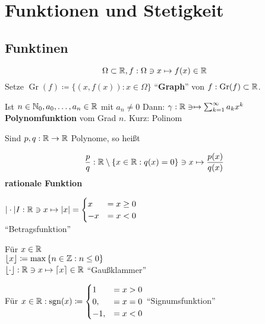 \section{Funktionen und Stetigkeit}
\subsection{Funktinen}

\[
	\Omega \subset \mathbb{R} , f: \Omega \ni x \mapsto f(x) \in \mathbb{R} 
\]
Setze $ \operatorname{Gr}(f) \coloneqq \{ (x, f(x)): x \in \Omega \} $ ``\textbf{Graph}'' von $ f: \operatorname{Gr}(f) \subset \mathbb{R}  $.
\begin{subexample}
	Ist $ n \in \mathbb{N}_0, a_0, \dotsc, a_n \in \mathbb{R}  $ mit $ a_n \neq  0 $ Dann: $ \gamma: \mathbb{R} \ni \mapsto \sum_{k=1}^{\infty} a_k x^k $\textbf{Polynomfunktion} vom Grad $ n $. Kurz: Polinom
\end{subexample}

\begin{subexample}
	Sind $ p, q: \mathbb{R} \to \mathbb{R}  $ Polynome, so heißt
	
	\[
		\frac{ p }{ q } : \mathbb{R} \setminus \{x \in \mathbb{R} :q(x) = 0\} \ni x \mapsto \frac{ p(x) }{ q(x) }
	\]
	\textbf{rationale Funktion}
\end{subexample}

\begin{subexample}
	$ |\cdot| I: \mathbb{R} \ni x \mapsto \left| x \right| = \begin{cases}
		x &= x \geq 0 \\
		-x &= x < 0 \\
	\end{cases} $\\
	``Betragsfunktion''
\end{subexample}

\begin{subexample}
	Für $ x \in \mathbb{R}  $\\
	$ \left\lfloor x \right\rfloor \coloneqq \max \left\{ n \in \mathbb{Z} : n \leq 0 \right\}  $\\
	$ \left\lfloor \cdot  \right\rfloor : \mathbb{R} \ni x \mapsto \left\lceil x \right\rceil \in \mathbb{R}  $ ``Gaußklammer''
\end{subexample}

\begin{subexample}
	Für $ x \in \mathbb{R} : \operatorname{sgn}(x) \coloneqq \begin{cases}
		1 &= x>0 \\
		0, &= x = 0 \\
		-1, &= x < 0 \\
	\end{cases} $ ``Signumsfunktion''
\end{subexample}

